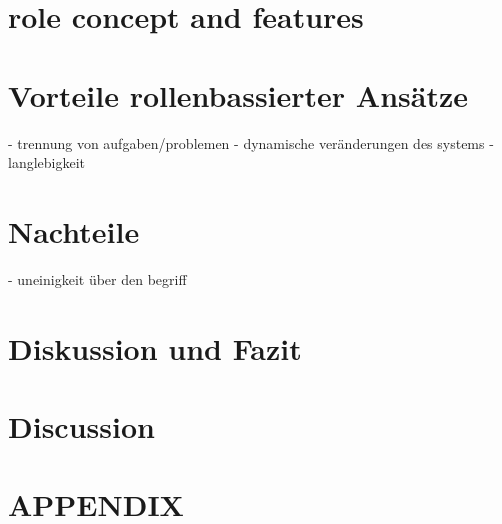 \documentclass[prodmode,acmtap]{acmlarge}
\begin{document}
\section{role concept and features}

\section{Vorteile rollenbassierter Ansätze}
- trennung von aufgaben/problemen
- dynamische veränderungen des systems
- langlebigkeit
\section{Nachteile}
- uneinigkeit über den begriff 
\section{Diskussion und Fazit}


\section{Discussion}


\appendix
\section*{APPENDIX}
\setcounter{section}{1}









\elecappendix
\end{document}
